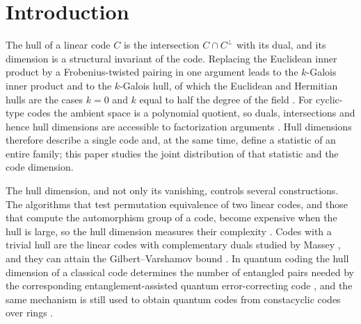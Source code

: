 
\section{Introduction}\label{sec:intro}

The hull of a linear code $C$ is the intersection $C\cap C^{\perp}$ with its
dual, and its dimension is a structural invariant of the code. Replacing the
Euclidean inner product by a Frobenius-twisted pairing in one argument leads to
the $k$-Galois inner product and to the $k$-Galois hull, of which the Euclidean
and Hermitian hulls are the cases $k=0$ and $k$ equal to half the degree of the
field \cite{fanZhang2017}. For cyclic-type codes the ambient space is a
polynomial quotient, so duals, intersections and hence hull dimensions are
accessible to factorization arguments \cite{huffmanPless2003}. Hull dimensions
therefore describe a single code and, at the same time, define a statistic of an
entire family; this paper studies the joint distribution of that statistic and
the code dimension.

The hull dimension, and not only its vanishing, controls several constructions.
The algorithms that test permutation equivalence of two linear codes, and those
that compute the automorphism group of a code, become expensive when the hull is
large, so the hull dimension measures their complexity \cite{sendrier1997}.
Codes with a trivial hull are the linear codes with complementary duals studied
by Massey \cite{massey1992}, and they can attain the Gilbert--Varshamov bound
\cite{sendrier2004}. In quantum coding the hull
dimension of a classical code determines the number of entangled pairs needed by
the corresponding entanglement-assisted quantum error-correcting code
\cite{brun2006,wildeBrun2008}, and the same mechanism is still used to obtain
quantum codes from constacyclic codes over rings \cite{zhang2026}.

